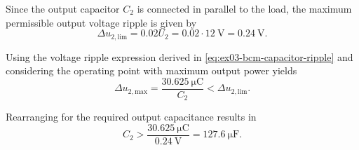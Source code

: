 \begin{solutionblock}
	Since the output capacitor $C_2$ is connected in parallel
	to the load, the maximum permissible output voltage ripple is
	given by
	\begin{equation}
		\Delta u_{2,\mathrm{lim}}
		= 0.02 U_2
		= 0.02 \cdot \SI{12}{\volt}
		= \SI{0.24}{\volt}.
	\end{equation}

	Using the voltage ripple expression derived in
	\eqref{eq:ex03-bcm-capacitor-ripple} and considering the
	operating point with maximum output power yields
	\begin{equation}
		\Delta u_{2,\mathrm{max}}
		= \frac{\SI{30.625}{\micro\coulomb}}{C_2}
		< \Delta u_{2,\mathrm{lim}}.
	\end{equation}

	Rearranging for the required output capacitance results in
	\begin{equation}
		C_2 >
		\frac{\SI{30.625}{\micro\coulomb}}{\SI{0.24}{\volt}}
		= \SI{127.6}{\micro\farad}.
	\end{equation}
\end{solutionblock}



